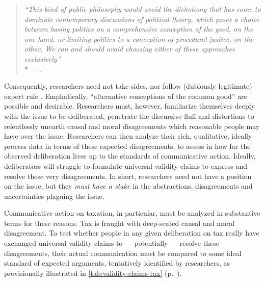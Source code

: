 \begin{quote}
	\emph{``This kind of public philosophy would avoid the dichotomy that has come to dominate contemporary discussions of political theory, which poses a choice between basing politics on a comprehensive conception of the good, on the one hand, or limiting politics to a conception of procedural justice, on the other.
	We can and should avoid choosing either of these approaches exclusively''}\\*
	--- \citet[90]{GutmannThompson-2004-aa}.
\end{quote}

Consequently, researchers need not take sides, nor follow (dubiously legitimate) expert rule \citep{Blok2007,Haas1992}.
Emphatically, ``alternative conceptions of the common good'' \citep[23]{Cohen-1989-aa} are possible and desirable.
Researchers must, however, familiarize themselves deeply with the issue to be deliberated, penetrate the discursive fluff and distortions to relentlessly unearth causal and moral disagreements which reasonable people may have over the issue.
Researchers can then analyze their rich, qualitative, ideally process data in terms of these expected disagreements, to assess in how far the observed deliberation lives up to the standards of communicative action.
Ideally, deliberators will struggle to formulate universal validity claims to express and resolve these very disagreements.
In short, researchers need not have a position on the issue, but they \emph{must have a stake} in the abstractions, disagreements and uncertainties plaguing the issue.

Communicative action on taxation, in particular, must be analyzed in substantive terms for these reasons.
Tax is fraught with deep-seated causal and moral disagreement.
To test whether people in any given deliberation on tax really have exchanged universal validity claims to --- potentially --- resolve these disagreements, their actual communication must be compared to some ideal standard of expected arguments, tentatively identified by researchers, as provisionally illustrated in \autoref{tab:validity-claims-tax} (p.~\pageref{tab:validity-claims-tax}).


